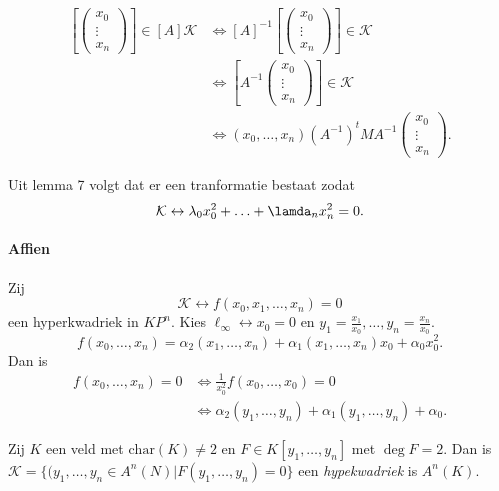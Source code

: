 \begin{align*}
	\left[ \begin{pmatrix} x_0 \\ \vdots \\ x_n \end{pmatrix}  \right]  \in [A] \mathcal{K}  &\iff [A]^{-1}\left[ \begin{pmatrix} x_0 \\ \vdots \\ x_n \end{pmatrix}  \right]  \in \mathcal{K} \\
	&\iff \left[A^{-1} \begin{pmatrix} x_0 \\ \vdots \\ x_n \end{pmatrix} \right] \in \mathcal{K} \\
	&\iff (x_0, \ldots, x_n)(A^{-1})^{t} M A^{-1}\begin{pmatrix} x_0 \\ \vdots \\ x_n \end{pmatrix} 
.\end{align*}

Uit lemma 7 volgt dat er een tranformatie bestaat zodat 
 \[
\mathcal{K}  \leftrightarrow \lambda_0x_0^2 + \ldots + \lamda_n x_n^2 = 0
.\] 

\paragraph{Affien}
Zij \[
	\mathcal{K}  \leftrightarrow f(x_0,x_1, \ldots, x_n) = 0
\] 
een hyperkwadriek in $KP^{n}$. Kies $\ell_\infty \leftrightarrow x_0 = 0$ en $y_1 = \frac{x_1}{x_0}, \ldots, y_n = \frac{x_n}{x_0}$.
\[
	f(x_0, \ldots, x_n) = \alpha_2(x_1, \ldots, x_n) + \alpha_1(x_1, \ldots, x_n) x_0 + \alpha_0 x_0^2
.\] 
Dan is
\begin{align*}
	f(x_0, \ldots, x_n) = 0 &\iff \frac{1}{x_0^2}f(x_0, \ldots, x_0) = 0\\
				&\iff \alpha_2(y_1, \ldots, y_n) + \alpha_1(y_1, \ldots, y_n) + \alpha_0
.\end{align*}
\begin{definitie}
	Zij $K$ een veld met $\text{char}(K) \ne 2$ en $F \in K[y_1, \ldots, y_n]$ met $\deg F = 2$. Dan is $\mathcal{K}  = \{(y_1, \ldots, y_n \in A^{n}(N) | F(y_1, \ldots, y_n) = 0\} $ een \emph{hypekwadriek} is $A^{n}(K)$.
\end{definitie}
